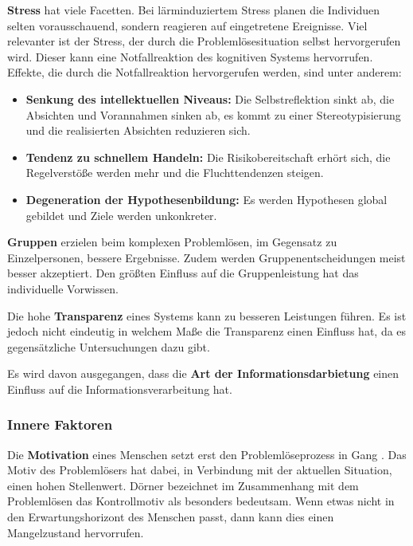 \textbf{Stress} hat viele Facetten. Bei lärminduziertem Stress planen die Individuen selten vorausschauend, sondern reagieren auf eingetretene Ereignisse. Viel relevanter ist der Stress, der durch die Problemlösesituation selbst hervorgerufen wird. Dieser kann eine Notfallreaktion des kognitiven Systems hervorrufen. Effekte, die durch die Notfallreaktion hervorgerufen werden, sind unter anderem:
\begin{itemize}
\item \textbf{Senkung des intellektuellen Niveaus:} Die Selbstreflektion sinkt ab, die Absichten und Vorannahmen sinken ab, es kommt zu einer Stereotypisierung und die realisierten Absichten reduzieren sich.
\item \textbf{Tendenz zu schnellem Handeln:} Die Risikobereitschaft erhört sich, die Regelverstöße werden mehr und die Fluchttendenzen steigen.
\item \textbf{Degeneration der Hypothesenbildung:} Es werden Hypothesen global gebildet und Ziele werden unkonkreter.
\end{itemize}

\textbf{Gruppen} erzielen beim komplexen Problemlösen, im Gegensatz zu Einzelpersonen, bessere Ergebnisse. Zudem werden Gruppenentscheidungen meist besser akzeptiert. Den größten Einfluss auf die Gruppenleistung hat das individuelle Vorwissen.

Die hohe \textbf{Transparenz} eines Systems kann zu besseren Leistungen führen. Es ist jedoch nicht eindeutig in welchem Maße die Transparenz einen Einfluss hat, da es gegensätzliche Untersuchungen dazu gibt.

Es wird davon ausgegangen, dass die \textbf{Art der Informationsdarbietung} einen Einfluss auf die Informationsverarbeitung hat.

\subsubsection*{Innere Faktoren}
Die \textbf{Motivation} eines Menschen setzt erst den Problemlöseprozess in Gang \cite{Dorner1984}. Das Motiv des Problemlösers hat dabei, in Verbindung mit der aktuellen Situation, einen hohen Stellenwert. Dörner \cite{Dorner1984} bezeichnet im Zusammenhang mit dem Problemlösen das Kontrollmotiv als besonders bedeutsam. Wenn etwas nicht in den Erwartungshorizont des Menschen passt, dann kann dies einen Mangelzustand hervorrufen.

